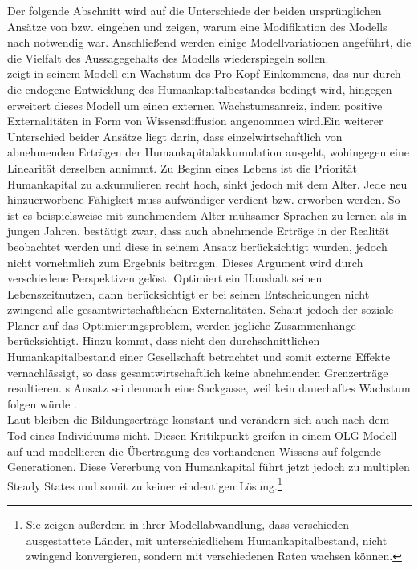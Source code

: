 Der folgende Abschnitt wird auf die Unterschiede der beiden urspr{\"u}nglichen Ans{\"a}tze von \citet{Uzawa.1965} bzw. \citet{Lucas.1988} eingehen und zeigen, warum eine Modifikation des Modells nach \citet{Uzawa.1965} notwendig war. Anschlie{\ss}end werden einige Modellvariationen angeführt, die die Vielfalt des Aussagegehalts des Modells wiederspiegeln sollen.\\
\citet{Uzawa.1965} zeigt in seinem Modell ein Wachstum des Pro-Kopf-Einkommens, das nur durch die endogene Entwicklung des Humankapitalbestandes bedingt wird, \citet{Lucas.1988} hingegen erweitert dieses Modell um einen externen Wachstumsanreiz, indem positive Externalitäten in Form von Wissensdiffusion angenommen wird.\newline Ein weiterer Unterschied beider Ans{\"a}tze liegt darin, dass \citet{Lucas.1988} einzelwirtschaftlich von abnehmenden Ertr{\"a}gen der Humankapitalakkumulation ausgeht, wohingegen \citet{Uzawa.1965} eine Linearit{\"a}t derselben annimmt. Zu Beginn eines Lebens ist die Priorit{\"a}t Humankapital zu akkumulieren recht hoch, sinkt jedoch mit dem Alter. Jede neu hinzuerworbene F{\"a}higkeit muss aufwändiger verdient bzw. erworben werden. So ist es beispielsweise mit zunehmendem Alter m{\"u}hsamer Sprachen zu lernen als in jungen Jahren. \cite{Lucas.1988} best{\"a}tigt zwar, dass auch abnehmende Ertr{\"a}ge in der Realit{\"a}t beobachtet werden und diese in seinem Ansatz ber{\"u}cksichtigt wurden, jedoch nicht vornehmlich zum Ergebnis beitragen. Dieses Argument wird durch verschiedene Perspektiven gelöst. Optimiert ein Haushalt seinen Lebenszeitnutzen, dann berücksichtigt er bei seinen Entscheidungen nicht zwingend alle gesamtwirtschaftlichen Externalitäten. Schaut jedoch der soziale Planer auf das Optimierungsproblem, werden jegliche Zusammenhänge berücksichtigt. Hinzu kommt, dass \citet{Uzawa.1965} nicht den durchschnittlichen Humankapitalbestand einer Gesellschaft betrachtet und somit externe Effekte vernachl{\"a}ssigt, so dass gesamtwirtschaftlich keine abnehmenden Grenzerträge resultieren. \citeauthor{Uzawa.1965}s \citeyear{Uzawa.1965} Ansatz sei demnach eine Sackgasse, weil kein dauerhaftes Wachstum folgen w{\"u}rde \cite[S.~19]{Lucas.1988}.\\
Laut \citet{Lucas.1988} bleiben die Bildungsertr{\"a}ge konstant und ver{\"a}ndern sich auch nach dem Tod eines Individuums nicht. Diesen Kritikpunkt greifen \cite{Azariades.1990} in einem OLG-Modell auf und modellieren die {\"U}bertragung des vorhandenen Wissens auf folgende Generationen. Diese Vererbung von Humankapital f{\"u}hrt jetzt jedoch zu multiplen Steady States und somit zu keiner eindeutigen Lösung.\footnote{Sie zeigen au{\ss}erdem in ihrer Modellabwandlung, dass verschieden ausgestattete L{\"a}nder, mit unterschiedlichem Humankapitalbestand, nicht zwingend konvergieren, sondern mit verschiedenen Raten wachsen k{\"o}nnen.}\newline 
